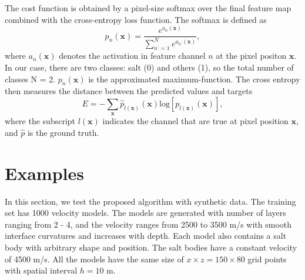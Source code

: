 \documentclass{cph18}
\begin{document}
The cost function is obtained by a pixel-size softmax over the final feature map combined with the cross-entropy loss function. The softmax is defined as 
\begin{equation}
p_n(\boldsymbol{x})=\frac{e^{{a_n(\boldsymbol{x})}}}{\sum_{n^\prime=1}^{N}e^{a_{n^\prime}(\boldsymbol{x})}},
\label{eqn:softmax}
\end{equation}
where $a_{n}(\boldsymbol{x})$ denotes the activation in feature channel $n$ at the pixel positon $\boldsymbol{x}$. In our case, there are two classes: salt (0) and others (1), so the total number of classes N = 2. $p_n(\boldsymbol{x})$ is the approximated maximum-function. The cross entropy then measures the distance between the predicted values and targets
\begin{equation}
E=-\sum_{\boldsymbol{x}}
	\hat{p}_{l(\boldsymbol{x})}(\boldsymbol{x})
	\mathrm{log}[
	p_{l(\boldsymbol{x})}(\boldsymbol{x})
	],
\label{eqn:crossentropy}
\end{equation}
where the subscript $l(\boldsymbol{x})$ indicates the channel that are true at pixel position $\boldsymbol{x}$, and $\hat{p}$ is the ground truth.

\section{Examples}

In this section, we test the proposed algorithm with synthetic data. 
The training set has 1000 velocity models. The models are generated with number of layers ranging from 2 - 4, and the velocity ranges from 2500 to 3500 m/s with smooth interface curvatures and increases with depth. Each model also contains a salt body with arbitrary shape and position. The salt bodies have a constant velocity of 4500 m/s. All the models have the same size of $x\times z = 150 \times 80$ grid points with spatial interval $h=10$ m. 
\end{document}
